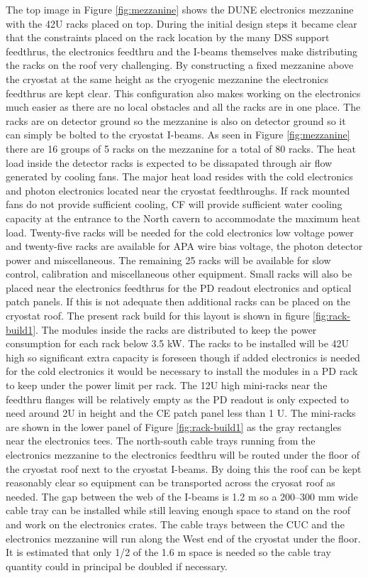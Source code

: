 The top image in Figure \ref{fig:mezzanine} shows the DUNE electronics mezzanine with the 42U racks placed on top. 
During the initial design steps it became clear that the constraints placed on the rack location by the many DSS support feedthrus, the electronics feedthru and the I-beams themselves make distributing the racks on the roof very challenging. 
By constructing a fixed mezzanine above the cryostat at the same height as the cryogenic mezzanine the electronics feedthrus are kept clear. 
This configuration also makes working on the electronics much easier as there are no local obstacles and all the racks are in one place.
The racks are on detector ground so the mezzanine is also on detector ground so it can simply be bolted to the cryostat I-beams. 
As seen in Figure \ref{fig:mezzanine} there are 16 groups of 5 racks on the mezzanine for a total of 80 racks. 
The heat load inside the detector racks is expected to be dissapated through air flow generated by cooling fans.  The major heat load resides with the cold electronics and photon electronics located near the cryostat feedthroughs.  If rack mounted fans do not provide sufficient cooling,  CF will provide sufficient water cooling capacity at the entrance to the North cavern to accommodate the maximum heat load. 
Twenty-five racks will be needed for the cold electronics low voltage power and twenty-five racks are available for APA wire bias voltage, the photon detector power and miscellaneous. 
The remaining 25 racks will be available for slow control, calibration and miscellaneous other equipment. 
Small racks will also be placed near the electronics feedthrus for the PD readout electronics and optical patch panels. 
If this is not adequate then additional racks can be placed on the cryostat roof. 
The present rack build for this layout is shown in figure \ref{fig:rack-build1}. The modules inside the racks are distributed to keep the power consumption for each rack below 3.5 \si{kW}.
The racks to be installed will be 42U high so significant extra capacity is foreseen though if added electronics is needed for the cold electronics it would be necessary to install the modules in a PD rack to keep under the power limit per rack.
The 12U high mini-racks near the feedthru flanges will be relatively empty as the PD readout is only expected to need around 2U in height and the CE patch panel less than 1 U. The mini-racks are shown in the lower panel of Figure \ref{fig:rack-build1} as the gray rectangles near the electronics tees.
The north-south cable trays running from the electronics mezzanine to the electronics feedthru will be routed under the floor of the cryostat roof next to the cryostat I-beams. 
By doing this the roof can be kept reasonably clear so equipment can be transported across the cryosat roof as needed. 
The gap between the web of the I-beams is 1.2 \si{m} so a 200--300 \si{mm} wide cable tray can be installed while still leaving enough space to stand on the roof and work on the electronics crates. 
The cable trays between the CUC and the electronics mezzanine will run along the West end of the cryostat under the floor. 
It is estimated that only 1/2 of the 1.6 \si{m} space is needed so  the cable tray quantity could in principal be doubled if necessary. 

